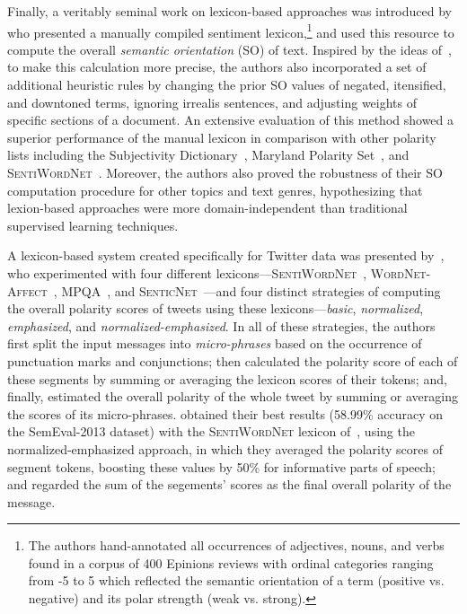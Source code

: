 Finally, a veritably seminal work on lexicon-based approaches was
introduced by~\citet{Taboada:11} who presented a manually compiled
sentiment lexicon,\footnote{The authors hand-annotated all occurrences
  of adjectives, nouns, and verbs found in a corpus of 400 Epinions
  reviews with ordinal categories ranging from -5 to 5 which reflected
  the semantic orientation of a term (positive vs. negative) and its
  polar strength (weak vs. strong).} and used this resource to compute
the overall \emph{semantic orientation} (SO) of text.  Inspired by the
ideas of~\citet{Polanyi:06}, to make this calculation more precise,
the authors also incorporated a set of additional heuristic rules by
changing the prior SO values of negated, itensified, and downtoned
terms, ignoring irrealis sentences, and adjusting weights of specific
sections of a document.  An extensive evaluation of this method showed
a superior performance of the manual lexicon in comparison with other
polarity lists including the Subjectivity Dictionary~\cite{Wilson:05},
Maryland Polarity Set~\cite{Mohammad:09}, and
\textsc{SentiWordNet}~\cite{Esuli:06c}.  Moreover, the authors also
proved the robustness of their SO computation procedure for other
topics and text genres, hypothesizing that lexion-based approaches
were more domain-independent than traditional supervised learning
techniques.

A lexicon-based system created specifically for Twitter data was
presented by~\citet{Musto:14}, who experimented with four different
lexicons---\textsc{SentiWordNet}~\cite{Esuli:06c},
\textsc{WordNet-Affect}~\cite{Strapparava:04},
\textsc{MPQA}~\cite{Wiebe:05}, and
\textsc{SenticNet}~\cite{Cambria:14}---and four distinct strategies of
computing the overall polarity scores of tweets using these
lexicons---\emph{basic}, \emph{normalized}, \emph{emphasized}, and
\emph{normalized-emphasized}.  In all of these strategies, the authors
first split the input messages into \emph{micro-phrases} based on the
occurrence of punctuation marks and conjunctions; then calculated the
polarity score of each of these segments by summing or averaging the
lexicon scores of their tokens; and, finally, estimated the overall
polarity of the whole tweet by summing or averaging the scores of its
micro-phrases.  \citeauthor{Musto:14} obtained their best results
(58.99\% accuracy on the SemEval-2013 dataset) with the
\textsc{SentiWordNet} lexicon of~\citet{Esuli:06c}, using the
normalized-emphasized approach, in which they averaged the polarity
scores of segment tokens, boosting these values by 50\% for
informative parts of speech; and regarded the sum of the segements'
scores as the final overall polarity of the message.

